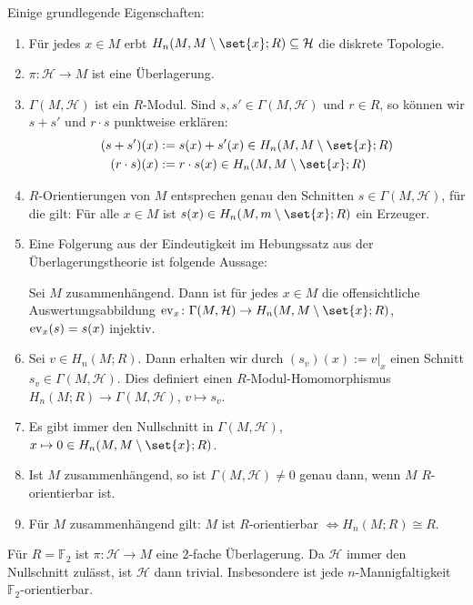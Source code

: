 \begin{bemerkung}[{name=[{Eigenschaften der Vereinigung der Homologieklassen}]},label=bem:1612]
	Einige grundlegende Eigenschaften:
	\begin{enumerate}[1),itemsep=1pt]
		\item Für jedes $x \in M$ erbt $H_n(M,M \setminus \set{x};R) \subseteq \mathcal{H}$ die diskrete Topologie.
		\item $\pi \colon \mathcal{H} \to M$ ist eine Überlagerung.
		\item $\Gamma(M,\mathcal{H})$ ist ein $R$-Modul. Sind $s,s' \in \Gamma(M,\mathcal{H})$ und $r \in R$, so können wir $s+s'$ und $r \cdot s$ punktweise erklären:
		\begin{align*}
			(s+s') (x) &:= s(x) + s'(x) \in H_n(M,M \setminus \set{x};R )\\
			(r \cdot s) (x) &:= r \cdot s(x) \in H_n(M,M \setminus \set{x};R )
		\end{align*}
		\item $R$-Orientierungen von $M$ entsprechen genau den Schnitten $s \in \Gamma(M,\mathcal{H})$, für die gilt: Für alle $x \in M$ ist 
		$s(x) \in H_n(M,m \setminus \set{x};R)$ ein Erzeuger.
		\item Eine Folgerung aus der Eindeutigkeit im Hebungssatz aus der Überlagerungstheorie ist folgende Aussage:
	
		Sei $M$ zusammenhängend. Dann ist für jedes $x \in M$ die offensichtliche Auswertungsabbildung $\ev_x\colon \Gamma(M,\mathcal{H}) \to H_n(M,M \setminus \set{x};R)$, $\operatorname{ev}_x(s)=s(x)$ injektiv.
		\item Sei $v \in H_n(M;R)$. Dann erhalten wir durch $(s_v)(x) := v|_x$ einen Schnitt $s_v\in \Gamma(M,\mathcal{H})$. Dies definiert einen $R$-Modul-Homomorphismus
		$H_n(M;R) \to \Gamma(M,\mathcal{H})$, $v \mapsto s_v$.
		\item Es gibt immer den Nullschnitt in $\Gamma(M,\mathcal{H})$, $x \mapsto 0\in H_n(M,M\setminus \set{x};R)$.
		\item Ist $M$ zusammenhängend, so ist $\Gamma(M,\mathcal{H})\not=0$ genau dann, wenn $M$ $R$-orientierbar ist.
		\item Für $M$ zusammenhängend gilt: $M$ ist $R$-orientierbar $\iff H_n(M;R) \cong R$. 
	\end{enumerate}
\end{bemerkung}

\begin{beispiel}[{name=[Für den Restklassenkörper $\mod 2$ erhält man eine 2-fache Überlagerung]}]
	Für $R=\mathbb{F}_2$ ist $\pi\colon \mathcal{H} \to M$ eine $2$-fache Überlagerung. 
	Da $\mathcal{H}$ immer den Nullschnitt zulässt, ist $\mathcal{H}$ dann trivial. 
	Insbesondere ist jede $n$-Mannigfaltigkeit $\mathbb{F}_2$-orientierbar.
\end{beispiel}

